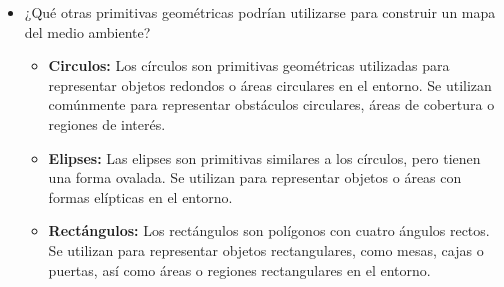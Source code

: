 \documentclass{article}
\begin{document}
\begin{itemize}
  \item {¿Qué otras primitivas geométricas podrían utilizarse para construir un mapa del medio ambiente?}

    
    \begin{itemize}
    \item \textbf{Circulos:} Los círculos son primitivas geométricas utilizadas para representar objetos redondos o áreas circulares en el entorno. Se utilizan comúnmente para representar obstáculos circulares, áreas de cobertura o regiones de interés. 
    \item \textbf{Elipses:} Las elipses son primitivas similares a los círculos, pero tienen una forma ovalada. Se utilizan para representar objetos o áreas con formas elípticas en el entorno.
    \item \textbf{Rectángulos:} Los rectángulos son polígonos con cuatro ángulos rectos. Se utilizan para representar objetos rectangulares, como mesas, cajas o puertas, así como áreas o regiones rectangulares en el entorno. 
    \end{itemize}
\end{itemize}
\end{document}
